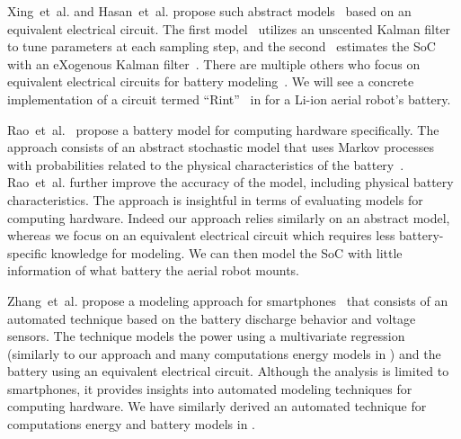 Xing~et~al. and Hasan~et~al. propose such abstract models~\citep{xing2014state,hasan2018exogenous} based on an equivalent electrical circuit. The first model~\citep{xing2014state} utilizes an unscented Kalman filter to tune parameters at each sampling step, and the second~\citep{hasan2018exogenous} estimates the SoC with an eXogenous Kalman filter~\citep{johansen2017exogenous}. 
There are multiple others who focus on equivalent electrical circuits for battery modeling~\citep{zhang2018online,zhang2012estimation,zhang2009battery,saeed2019electrical,mousavi2014various,hinz2019comparison,he2011evaluation}. We will see a concrete implementation of a circuit termed ``Rint''~\citep{mousavi2014various,hinz2019comparison,he2011evaluation} in  for a Li-ion aerial robot's battery.

Rao~et~al.~\citep{rao2005battery} propose a battery model for computing hardware specifically. The approach consists of an abstract stochastic model that uses Markov processes with probabilities related to the physical characteristics of the battery~\citep{panigrahi2001battery}. Rao~et~al. further improve the accuracy of the model, including physical battery characteristics. The approach is insightful in terms of evaluating models for computing hardware. Indeed our approach relies similarly on an abstract model, whereas we focus on an equivalent electrical circuit which requires less battery-specific knowledge for modeling. We can then model the SoC with little information of what battery the aerial robot mounts.

Zhang~et~al. propose a modeling approach for smartphones~\citep{zhang2010accurate} that consists of an automated technique based on the battery discharge behavior and voltage sensors. The technique models the power using a multivariate regression (similarly to our approach and many computations energy models in ) and the battery using an equivalent electrical circuit. Although the analysis is limited to smartphones, it provides insights into automated modeling techniques for computing hardware. We have similarly derived an automated technique for computations energy and battery models in .

